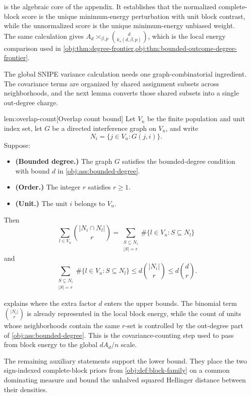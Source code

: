  is the algebraic core of the appendix. It establishes that the normalized complete-block score is the unique minimum-energy perturbation with unit block contrast, while the unnormalized score is the unique minimum-energy unbiased weight. The same calculation gives \(A_d\asymp_{\beta,p}\binom d{k_\star(d,\beta,p)}\), which is the local energy comparison used in \cref{obj:thm:degree-frontier,obj:thm:bounded-outcome-degree-frontier}.

The global SNIPE variance calculation needs one graph-combinatorial ingredient. The covariance terms are organized by shared assignment subsets across neighborhoods, and the next lemma converts those shared subsets into a single out-degree charge.

\begin{lemmav}{lem:overlap-count}[Overlap count bound]
Let \(V_n\) be the finite population and unit index set, let \(G\) be a directed interference graph on \(V_n\), and write
\[
N_i=\{j\in V_n:G(j,i)\}.
\]
Suppose:
\begin{itemize}
\item \textbf{(Bounded degree.)} The graph \(G\) satisfies the bounded-degree condition with bound \(d\) in \cref{obj:ass:bounded-degree}.
\item \textbf{(Order.)} The integer \(r\) satisfies \(r\ge 1\).
\item \textbf{(Unit.)} The unit \(i\) belongs to \(V_n\).
\end{itemize}
Then
\[
\sum_{l\in V_n}\binom{|N_i\cap N_l|}{r}
=
\sum_{\substack{S\subseteq N_i\\ |S|=r}}
\#\{l\in V_n:S\subseteq N_l\}
\]
and
\[
\sum_{\substack{S\subseteq N_i\\ |S|=r}}
\#\{l\in V_n:S\subseteq N_l\}
\le
d\binom{|N_i|}{r}
\le
d\binom{d}{r}.
\]
\end{lemmav}

 explains where the extra factor \(d\) enters the upper bounds. The binomial term \(\binom{|N_i|}{r}\) is already represented in the local block energy, while the count of units whose neighborhoods contain the same \(r\)-set is controlled by the out-degree part of \cref{obj:ass:bounded-degree}. This is the covariance-counting step used to pass from block energy to the global \(dA_d/n\) scale.

The remaining auxiliary statements support the lower bound. They place the two sign-indexed complete-block priors from \cref{obj:def:block-family} on a common dominating measure and bound the unhalved squared Hellinger distance between their densities.

